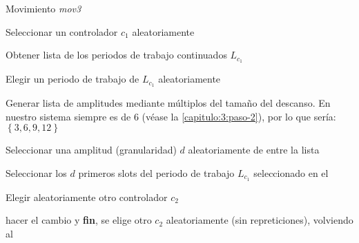 \begin{algorithm}[h]
	\caption{Movimiento \textit{mov3}}
	\label{algoritmo:entorno-mov3}
	
	\SetAlgoNoLine
	\SetAlgoNoEnd
	\DontPrintSemicolon
	\LinesNumbered
	
	\bigskip
	

	Seleccionar un controlador $c_1$ aleatoriamente \; \label{line:c1}
	\algovspace
		
	Obtener lista de los periodos de trabajo continuados $L_{c_1}$
	\algovspace
		
	Elegir un periodo de trabajo de $L_{c_1}$ aleatoriamente \label{line:3} \;
	\algovspace
		
	Generar lista de amplitudes mediante múltiplos del tamaño del descanso. En nuestro sistema siempre es de 6 (véase la \autoref{capitulo:3:paso-2}), por lo que sería: $\left\lbrace 3,6,9,12\right\rbrace $ \;
	\algovspace
		
	Seleccionar una amplitud (granularidad) $d$ aleatoriamente de entre la lista \label{line:amplitud}\;
	\algovspace
		
	Seleccionar los $d$ primeros slots del periodo de trabajo $L_{c_1}$ seleccionado en el \; %
	\algovspace
	
	Elegir aleatoriamente otro controlador $c_2$ \label{line:c2}\;
	\algovspace
	
	{hacer el cambio y \textbf{fin}, }
	{se elige otro $c_2$ aleatoriamente (sin repreticiones), volviendo al }
	\algovspace
	
	\algovspace
	
	\algovspace
	
	\algovspace	
\end{algorithm}


